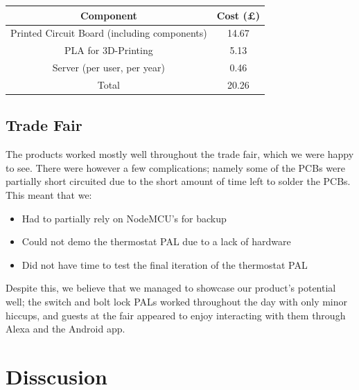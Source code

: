 \documentclass[onecolumn]{IEEEtran}
\begin{document}
{         \begin{center}
            \begin{tabular}{||c | c ||} 
                 \hline
                 Component & Cost (£) \\ [0.5ex] 
                 \hline\hline
                 Printed Circuit Board (including components) & 14.67\\ 
                 \hline
                 PLA for 3D-Printing & 5.13\\
                 \hline
                 Server (per user, per year) & 0.46\\
                 \hline\hline
                 Total & 20.26\\
                 \hline
            \end{tabular}
        \end{center}
        
    
    \subsection{Trade Fair}
        {The products worked mostly well throughout the trade fair, which we were happy to see. There were however a few complications; namely some of the PCBs were partially short circuited due to the short amount of time left to solder the PCBs. This meant that we:}
            \begin{itemize}
                \item {Had to partially rely on NodeMCU’s for backup}
                \item {Could not demo the thermostat PAL due to a lack of hardware}
                \item {Did not have time to test the final iteration of the thermostat PAL}
            \end{itemize}
        {Despite this, we believe that we managed to showcase our product’s potential well; the switch and bolt lock PALs worked throughout the day with only minor hiccups, and guests at the fair appeared to enjoy interacting with them through Alexa and the Android app.}


\section{Disscusion}
}
\end{document}
